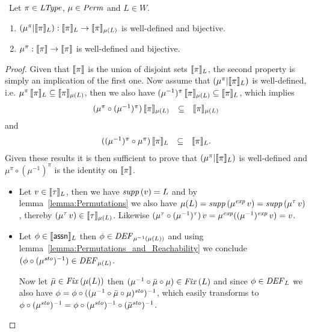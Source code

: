 \documentclass[12pt,a4paper]{report}
\newcommand{\sexp}{\nstyle{exp}}
\newcommand{\ssto}{\nstyle{sto}}
\newcommand{\DEF}{\nstyle{DEF}}
\newcommand{\Fix}[1]{\nstyle{Fix}\,(#1)}
\begin{document}
\begin{lemma} \
  Let $\pi \in \mathit{LType}$, $\mu\in\mathit{Perm}$ and $L\in W$.
  \begin{enumerate}
    \item $(\mu^\pi|\llbracket\pi\rrbracket_L): \llbracket\pi\rrbracket_L \to \llbracket\pi\rrbracket_{\mu(L)}$ is
          well-defined and bijective.
    \item $\mu^\pi: \llbracket\pi\rrbracket \to \llbracket\pi\rrbracket$ is well-defined and bijective.
  \end{enumerate}
\end{lemma}

\begin{proof}
  Given that $\llbracket\pi\rrbracket$ is the union of disjoint sets $\llbracket\pi\rrbracket_L$, the second
  property is simply an implication of the first one. Now assume that $(\mu^\pi|\llbracket\pi\rrbracket_L)$
  is well-defined, i.e. $\mu^\pi\,\llbracket\pi\rrbracket_L \subseteq \llbracket\pi\rrbracket_{\mu(L)}$, then
  we also have $(\mu^{-1})^\pi\,\llbracket\pi\rrbracket_{\mu(L)} \subseteq \llbracket\pi\rrbracket_L$, which
  implies
  \[\begin{array}{rcl}
    (\mu^\pi \circ (\mu^{-1})^\pi)\,\llbracket\pi\rrbracket_{\mu(L)} &\subseteq& \llbracket\pi\rrbracket_{\mu(L)}
  \end{array}\]
  and
  \[\begin{array}{rcl}
    ((\mu^{-1})^\pi \circ \mu^\pi)\,\llbracket\pi\rrbracket_L &\subseteq& \llbracket\pi\rrbracket_L.
  \end{array}\]
  Given these results it is then sufficient to prove that $(\mu^\pi|\llbracket\pi\rrbracket_L)$ is
  well-defined and $\mu^\pi \circ (\mu^{-1})^\pi$ is the identity on $\llbracket\pi\rrbracket$.
  \begin{itemize}
    \item Let $v \in \llbracket\tau\rrbracket_L$, then we have $\mathit{supp}\,(v) = L$ and by lemma~\ref{lemma:Permutations}
          we also have $\mu(L) = \supp{\mu^\sexp\,v} = \supp{\mu^\tau\,v}$, thereby
          $(\mu^\tau\,v) \in \llbracket\tau\rrbracket_{\mu(L)}$. Likewise
          $(\mu^\tau \circ(\mu^{-1})^\tau)\,v = \mu^\sexp((\mu^{-1})^\sexp\,v) = v$.

    \item Let $\phi \in \llbracket\mathsf{assn}\rrbracket_L$ then $\phi \in \DEF_{\mu^{-1}(\mu(L))}$ and using
          lemma~\ref{lemma:Permutations_and_Reachability} we conclude $(\phi\circ(\mu^\ssto)^{-1})\in\DEF_{\mu(L)}$.

          Now let $\bar{\mu}\in\Fix{\mu(L)}$ then $(\mu^{-1}\circ \bar{\mu} \circ \mu) \in \Fix{L}$ and since
          $\phi\in\DEF_L$ we also have $\phi = \phi \circ ((\mu^{-1}\circ \bar{\mu} \circ \mu)^\ssto)^{-1}$,
          which easily transforms to $\phi\circ (\mu^\ssto)^{-1} = \phi \circ (\mu^\ssto)^{-1} \circ (\bar{\mu}^\ssto)^{-1}$.


\end{itemize}
\end{proof}
\end{document}
